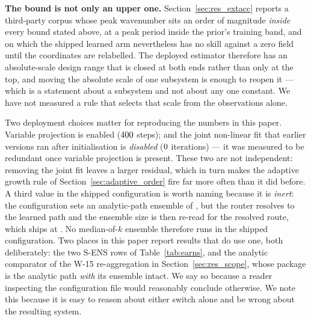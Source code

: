 \documentclass[review]{elsarticle}
\begin{document}
\textbf{The bound is not only an upper one.} Section~\ref{sec:res_extacc} reports a
third-party corpus whose peak wavenumber sits an order of magnitude \emph{inside}
every bound stated above, at a peak period inside the prior's training band, and on
which the shipped learned arm nevertheless has no skill against a zero field until
the coordinates are relabelled. The deployed estimator therefore has an
absolute-scale design range that is closed at both ends rather than only at the top,
and moving the absolute scale of one subsystem is enough to reopen it --- which is a
statement about a subsystem and not about any one constant. We have not measured a
rule that selects that scale from the observations alone.

Two deployment choices matter for reproducing the numbers in this paper. Variable
projection is enabled ($400{}$ steps); and the joint non-linear fit that
earlier versions ran after initialisation is \emph{disabled} ($0{}$ iterations) --- it was measured to be
redundant once variable projection is present. These two are not independent:
removing the joint fit leaves a larger residual, which in turn makes the adaptive
growth rule of Section~\ref{sec:adaptive_order} fire far more often than it did
before.
A third value in the shipped configuration is worth naming because it is
\emph{inert}: the configuration sets an analytic-path ensemble of
\DepAnalyticEnsK{}, but the router resolves to the learned path and the ensemble
size is then re-read for the resolved route, which ships at \DepLearnedEnsK{}. No
median-of-$k$ ensemble therefore runs in the shipped configuration. Two places in
this paper report results that do use one, both deliberately: the two S-ENS rows of
Table~\ref{tab:earns}, and the analytic comparator of the W-15 re-aggregation in
Section~\ref{sec:res_scope}, whose package is the analytic path \emph{with} its
ensemble intact.
We say
so because a reader inspecting the configuration file would reasonably conclude
otherwise.
We note this because it is easy to reason about either switch alone and be
wrong about the resulting system.
\end{document}
